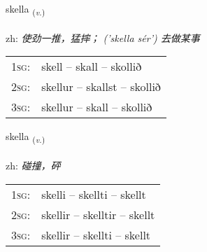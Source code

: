 \documentclass[frontgrid, backgrid]{flacards}\usepackage[]{graphicx}\usepackage[]{color}
\begin{document}
\renewcommand{\flhead}{\vskip5pt \fboxsep=0pt {\small\bfseries\footnotesize Sagnorð | 动词}}
\renewcommand{\fcfoot}{\vskip5pt \fboxsep=0pt \hspace{2pt}{\small\bfseries\footnotesize 2K}}

\renewcommand{\blhead}{\vskip5pt {\small\bfseries\footnotesize Sagnorð | 动词 }}
\renewcommand{\bcfoot}{\vskip5pt \hspace{2pt}{\small\bfseries\footnotesize 2K}}


{skella \small{\textsubscript{(\textit{v.})}} \\[1ex] %
\textphonetic{[scɛtla]} \\
zh: \emph{使劲一推，猛摔； ('skella sér') 去做某事} \\  [2ex]
\renewcommand*{\arraystretch}{0.8}
\begin{tabular}{p{1cm}l}
\textsc{1sg}: & skell -- skall -- skollið \\ 
\textsc{2sg}: & skellur -- skallst -- skollið \\ 
\textsc{3sg}: & skellur -- skall -- skollið \\ 
\end{tabular}
}

\renewcommand{\flhead}{\vskip5pt \fboxsep=0pt {\small\bfseries\footnotesize Sagnorð | 动词}}
\renewcommand{\fcfoot}{\vskip5pt \fboxsep=0pt \hspace{2pt}{\small\bfseries\footnotesize 2K}}

\renewcommand{\blhead}{\vskip5pt {\small\bfseries\footnotesize Sagnorð | 动词 }}
\renewcommand{\bcfoot}{\vskip5pt \hspace{2pt}{\small\bfseries\footnotesize 2K}}


{skella \small{\textsubscript{(\textit{v.})}} \\[1ex] %
\textphonetic{[scɛtla]} \\
zh: \emph{碰撞，砰} \\  [2ex]
\renewcommand*{\arraystretch}{0.8}
\begin{tabular}{p{1cm}l}
\textsc{1sg}: & skelli -- skellti -- skellt \\ 
\textsc{2sg}: & skellir -- skelltir -- skellt \\ 
\textsc{3sg}: & skellir -- skellti -- skellt \\ 
\end{tabular}
}
\end{document}
